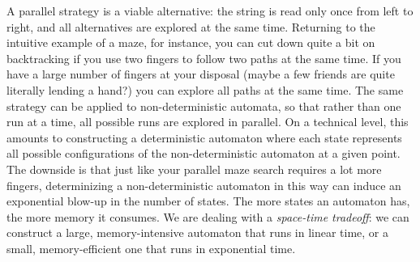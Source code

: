 A parallel strategy is a viable alternative: the string is read only once from left to right, and all alternatives are explored at the same time.
Returning to the intuitive example of a maze, for instance, you can cut down quite a bit on backtracking if you use two fingers to follow two paths at the same time.
If you have a large number of fingers at your disposal (maybe a few friends are quite literally lending a hand?) you can explore all paths at the same time.
The same strategy can be applied to non-deterministic automata, so that rather than one run at a time, all possible runs are explored in parallel.
On a technical level, this amounts to constructing a deterministic automaton where each state represents all possible configurations of the non-deterministic automaton at a given point.
The downside is that just like your parallel maze search requires a lot more fingers, determinizing a non-deterministic automaton in this way can induce an exponential blow-up in the number of states.
The more states an automaton has, the more memory it consumes.
We are dealing with a \emph{space-time tradeoff}: we can construct a large, memory-intensive automaton that runs in linear time, or a small, memory-efficient one that runs in exponential time.
%

